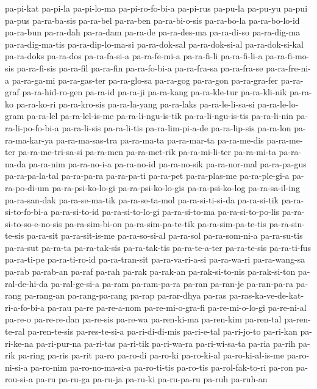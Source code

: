{pa-pi-kat pa-pi-la pa-pi-lo-ma pa-pi-ro-fo-bi-a pa-pi-rus pa-pu-la
pa-pu-yu pa-pui pa-pus pa-ra-ba-sis pa-ra-bel pa-ra-ben pa-ra-bi-o-sis
pa-ra-bo-la pa-ra-bo-lo-id pa-ra-bun pa-ra-dah pa-ra-dam pa-ra-de
pa-ra-des-ma pa-ra-di-so pa-ra-dig-ma pa-ra-dig-ma-tis pa-ra-dip-lo-ma-si
pa-ra-dok-sal pa-ra-dok-si-al pa-ra-dok-si-kal pa-ra-doks pa-ra-dos
pa-ra-fa-si-a pa-ra-fe-mi-a pa-ra-fi-li pa-ra-fi-li-a pa-ra-fi-mo-sis
pa-ra-fi-sis pa-ra-fil pa-ra-fin pa-ra-fo-bi-a pa-ra-fra-sa pa-ra-fra-se
pa-ra-fre-ni-a pa-ra-ga-mi pa-ra-gas-ter pa-ra-glo-sa pa-ra-gog pa-ra-gon
pa-ra-gra-fer pa-ra-graf pa-ra-hid-ro-gen pa-ra-id pa-ra-ji pa-ra-kang
pa-ra-kle-tur pa-ra-kli-nik pa-ra-ko pa-ra-ko-ri pa-ra-kro-sis
pa-ra-la-yang pa-ra-laks pa-ra-le-li-sa-si pa-ra-le-lo-gram pa-ra-lel
pa-ra-lel-is-me pa-ra-li-ngu-is-tik pa-ra-li-ngu-is-tis pa-ra-li-nin
pa-ra-li-po-fo-bi-a pa-ra-li-sis pa-ra-li-tis pa-ra-lim-pi-a-de
pa-ra-lip-sis pa-ra-lon pa-ra-ma-kar-ya pa-ra-ma-sas-tra pa-ra-ma-ta
pa-ra-mar-ta pa-ra-me-dis pa-ra-me-ter pa-ra-me-tri-sa-si pa-ra-men
pa-ra-met-rik pa-ra-mi-li-ter pa-ra-mi-ta pa-ra-na-da pa-ra-nim
pa-ra-no-i-a pa-ra-no-id pa-ra-no-sik pa-ra-nor-mal pa-ra-pa-gus
pa-ra-pa-la-tal pa-ra-pa-ra pa-ra-pa-ti pa-ra-pet pa-ra-plas-me
pa-ra-ple-gi-a pa-ra-po-di-um pa-ra-psi-ko-lo-gi pa-ra-psi-ko-lo-gis
pa-ra-psi-ko-log pa-ra-sa-il-ing pa-ra-san-dak pa-ra-se-ma-tik
pa-ra-se-ta-mol pa-ra-si-ti-si-da pa-ra-si-tik pa-ra-si-to-fo-bi-a
pa-ra-si-to-id pa-ra-si-to-lo-gi pa-ra-si-to-ma pa-ra-si-to-po-lis
pa-ra-si-to-so-e-no-sis pa-ra-sim-bi-on pa-ra-sim-pa-te-tik
pa-ra-sim-pa-te-tis pa-ra-sin-te-sis pa-ra-sit pa-ra-sit-is-me
pa-ra-so-si-al pa-ra-sol pa-ra-som-ni-a pa-ra-su-tis pa-ra-sut pa-ra-ta
pa-ra-tak-sis pa-ra-tak-tis pa-ra-te-a-ter pa-ra-te-sis pa-ra-ti-fus
pa-ra-ti-pe pa-ra-ti-ro-id pa-ra-tran-sit pa-ra-va-ri-a-si pa-ra-wa-ri
pa-ra-wang-sa pa-rab pa-rab-an pa-raf pa-rah pa-rak pa-rak-an
pa-rak-si-to-nis pa-rak-si-ton pa-ral-de-hi-da pa-ral-ge-si-a pa-ram
pa-ram-pa-ra pa-ran pa-ran-je pa-ran-pa-ra pa-rang pa-rang-an
pa-rang-pa-rang pa-rap pa-rar-dhya pa-ras pa-ras-ka-ve-de-kat-ri-a-fo-bi-a
pa-rau pa-re pa-re-a-nom pa-re-mi-o-gra-fi pa-re-mi-o-lo-gi pa-re-ni-al
pa-re-o pa-re-re-dan pa-re-sis pa-re-wa pa-ren-ki-ma pa-ren-kim pa-ren-tal
pa-ren-te-ral pa-ren-te-sis pa-res-te-si-a pa-ri-di-di-mis pa-ri-e-tal
pa-ri-jo-to pa-ri-kan pa-ri-ke-na pa-ri-pur-na pa-ri-tas pa-ri-tik
pa-ri-wa-ra pa-ri-wi-sa-ta pa-ria pa-rih pa-rik pa-ring pa-ris pa-rit
pa-ro pa-ro-di pa-ro-ki pa-ro-ki-al pa-ro-ki-al-is-me pa-ro-ni-si-a
pa-ro-nim pa-ro-no-ma-si-a pa-ro-ti-tis pa-ro-tis pa-rol-fak-to-ri pa-ron
pa-rou-si-a pa-ru pa-ru-ga pa-ru-ja pa-ru-ki pa-ru-pa-ru pa-ruh pa-ruh-an
}
